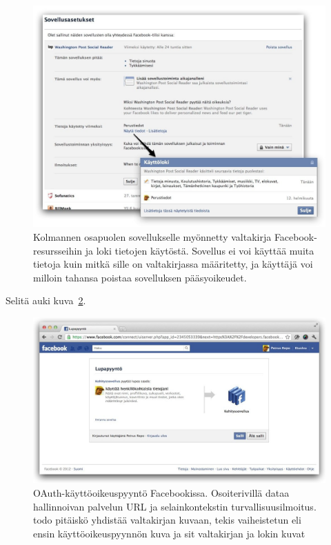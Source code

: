 \documentclass[finnish,gradu]{tktltiki}
\begin{document}
  \begin{figure}
    \centering
    \includegraphics[width=1.0\textwidth]{images/fb_app_acl.jpg}
    \caption{Kolmannen osapuolen sovellukselle myönnetty valtakirja Facebook-resursseihin ja loki tietojen käytöstä. Sovellus ei voi käyttää muita tietoja kuin mitkä sille on valtakirjassa määritetty, ja käyttäjä voi milloin tahansa poistaa sovelluksen pääsyoikeudet.}
    \label{fig:facebook_app_acl}
  \end{figure}


  Selitä auki kuva~\ref{fig:facebook_oauth_lupapyynto}.

  \begin{figure}
    \centering
    \includegraphics[width=1.0\textwidth]{images/facebook_oauth_lupapyynto.jpg}
    \caption{OAuth-käyttöoikeuspyyntö Facebookissa. Osoiterivillä dataa hallinnoivan palvelun URL ja selainkontekstin turvallisuusilmoitus. todo pitäiskö yhdistää valtakirjan kuvaan, tekis vaiheistetun eli ensin käyttöoikeuspyynnön kuva ja sit valtakirjan ja lokin kuvat}
    \label{fig:facebook_oauth_lupapyynto}
  \end{figure}
\end{document}
